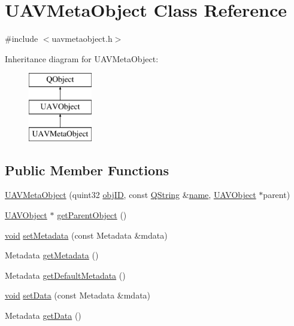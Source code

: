 \hypertarget{class_u_a_v_meta_object}{\section{U\-A\-V\-Meta\-Object Class Reference}
\label{class_u_a_v_meta_object}
}


{\ttfamily \#include $<$uavmetaobject.\-h$>$}

Inheritance diagram for U\-A\-V\-Meta\-Object\-:\begin{figure}[H]
\begin{center}
\leavevmode
\includegraphics[height=3.000000cm]{class_u_a_v_meta_object}
\end{center}
\end{figure}
\subsection*{Public Member Functions}
\begin{DoxyCompactItemize}
\item 
\hyperlink{group___u_a_v_objects_plugin_ga82e8ae42383522ae0507b881d11abba5}{U\-A\-V\-Meta\-Object} (quint32 \hyperlink{group___u_a_v_objects_plugin_gafc50acdaa311c9fd9aaddf90fd578c14}{obj\-I\-D}, const \hyperlink{group___u_a_v_objects_plugin_gab9d252f49c333c94a72f97ce3105a32d}{Q\-String} \&\hyperlink{glext_8h_ad977737dfc9a274a62741b9500c49a32}{name}, \hyperlink{class_u_a_v_object}{U\-A\-V\-Object} $\ast$parent)
\item 
\hyperlink{class_u_a_v_object}{U\-A\-V\-Object} $\ast$ \hyperlink{group___u_a_v_objects_plugin_gabfdc167657f1b0eae61e412313785e7b}{get\-Parent\-Object} ()
\item 
\hyperlink{group___u_a_v_objects_plugin_ga444cf2ff3f0ecbe028adce838d373f5c}{void} \hyperlink{group___u_a_v_objects_plugin_ga714e256632f9fbd0aba5c6a9aaae422a}{set\-Metadata} (const Metadata \&mdata)
\item 
Metadata \hyperlink{group___u_a_v_objects_plugin_ga3830028095cc0fceed15e72baae231d9}{get\-Metadata} ()
\item 
Metadata \hyperlink{group___u_a_v_objects_plugin_ga151811823619af6a7231118c8e64f843}{get\-Default\-Metadata} ()
\item 
\hyperlink{group___u_a_v_objects_plugin_ga444cf2ff3f0ecbe028adce838d373f5c}{void} \hyperlink{group___u_a_v_objects_plugin_ga442400ff0a37c73b50d6e5ad9533ace4}{set\-Data} (const Metadata \&mdata)
\item 
Metadata \hyperlink{group___u_a_v_objects_plugin_gaa60fd952fa89a624b43ba3dcf4a7c953}{get\-Data} ()
\end{DoxyCompactItemize}
